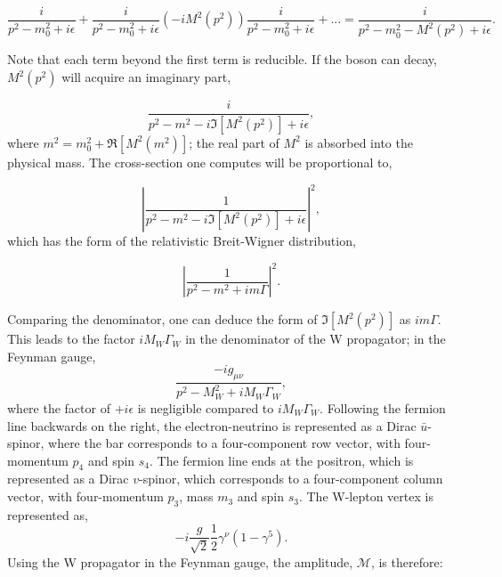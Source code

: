 \documentclass[a4paper,11pt]{article}
\begin{document}
$$\frac{i}{p^2-m_0^2+i\epsilon} + \frac{i}{p^2-m_0^2+i\epsilon} (-iM^2(p^2))\frac{i}{p^2-m_0^2+i\epsilon}+ ... = \frac{i}{p^2-m_0^2-M^2(p^2)+i\epsilon}. $$

Note that each term beyond the first term is reducible. If the boson can decay, $M^2(p^2)$ will acquire an imaginary part,

$$\frac{i}{p^2-m^2 - i\Im[M^2(p^2)]+i\epsilon}, $$
where $m^2 = m_0^2 + \Re[M^2(m^2)]$; the real part of $M^2$ is absorbed into the physical mass. The cross-section one computes will be proportional to,

$$ \left| \frac{1}{p^2 -m^2 -  i\Im[M^2(p^2)]+i\epsilon	}\right|^2,$$
which has the form of the relativistic Breit-Wigner distribution, 

$$\left|\frac{1}{p^2-m^2+im\Gamma}\right|^2 .$$

Comparing the denominator, one can deduce the form of $\Im[M^2(p^2)]$ as $im\Gamma$. This leads to the factor $iM_W\Gamma_W$ in the denominator of the W propagator; in the Feynman gauge, $$\frac{-ig_{\mu\nu}}{p^2 - M_W^2 +iM_W\Gamma_W},$$
where the factor of $+i\epsilon$ is negligible compared to $iM_W\Gamma_W$. 
Following the fermion line backwards on the right, the electron-neutrino is represented as a Dirac $\bar{u}$-spinor, where the bar corresponds to a four-component row vector, with four-momentum $p_4$ and spin $s_4$. The fermion line ends at the positron, which is represented as a Dirac $v$-spinor, which corresponds to a four-component column vector, with four-momentum $p_3$, mass $m_3$ and spin $s_3$. The W-lepton vertex is represented as, $$-i\frac{g}{\sqrt{2}}\frac{1}{2}\gamma^\nu (1-\gamma^5).$$ 
Using the W propagator in the Feynman gauge, the amplitude, $\mathcal{M}$, is therefore: 
\end{document}
